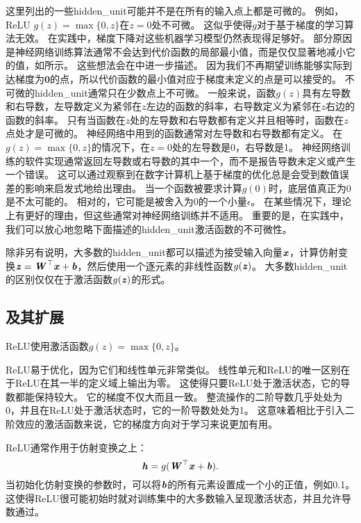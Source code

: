 这里列出的一些\gls{hidden_unit}可能并不是在所有的输入点上都是可微的。
例如，\gls{ReLU} $g(z)=\max\{0, z\}$在$z=0$处不可微。
这似乎使得$g$对于基于梯度的学习算法无效。
在实践中，梯度下降对这些机器学习模型仍然表现得足够好。
部分原因是神经网络训练算法通常不会达到代价函数的局部最小值，而是仅仅显著地减小它的值，如所示。
这些想法会在中进一步描述。
因为我们不再期望训练能够实际到达梯度为$\bm{0}$的点，所以代价函数的最小值对应于梯度未定义的点是可以接受的。
不可微的\gls{hidden_unit}通常只在少数点上不可微。
一般来说，函数$g(z)$具有左导数和右导数，左导数定义为紧邻在$z$左边的函数的斜率，右导数定义为紧邻在$z$右边的函数的斜率。
只有当函数在$z$处的左导数和右导数都有定义并且相等时，函数在$z$点处才是可微的。
神经网络中用到的函数通常对左导数和右导数都有定义。
在$g(z)=\max\{0,z\}$的情况下，在$z=0$处的左导数是0，右导数是1。
神经网络训练的软件实现通常返回左导数或右导数的其中一个，而不是报告导数未定义或产生一个错误。
这可以通过观察到在数字计算机上基于梯度的优化总是会受到数值误差的影响来启发式地给出理由。
当一个函数被要求计算$g(0)$时，底层值真正为0 是不太可能的。
相对的，它可能是被舍入为0的一个小量$\epsilon$。
在某些情况下，理论上有更好的理由，但这些通常对神经网络训练并不适用。
重要的是，在实践中，我们可以放心地忽略下面描述的\gls{hidden_unit}激活函数的不可微性。


除非另有说明，大多数的\gls{hidden_unit}都可以描述为接受输入向量$\boldsymbol{\mathit{x}}$，计算仿射变换$\boldsymbol{\mathit{z}}=\boldsymbol{\mathit{W}}^\top \boldsymbol{\mathit{x}}+\boldsymbol{\mathit{b}}$，然后使用一个逐元素的非线性函数$g(\boldsymbol{\mathit{z}})$。
大多数\gls{hidden_unit}的区别仅仅在于激活函数$g(\boldsymbol{\mathit{z}})$的形式。

\subsection{及其扩展}
\label{sec:rectified_linear_units_and_their_generalizations}

\gls{ReLU}使用激活函数$g(z)=\max\{0, z\}$。

\gls{ReLU}易于优化，因为它们和线性单元非常类似。
线性单元和\gls{ReLU}的唯一区别在于\gls{ReLU}在其一半的定义域上输出为零。
这使得只要\gls{ReLU}处于激活状态，它的导数都能保持较大。
它的梯度不仅大而且一致。
整流操作的二阶导数几乎处处为0，并且在\gls{ReLU}处于激活状态时，它的一阶导数处处为1。
这意味着相比于引入二阶效应的激活函数来说，它的梯度方向对于学习来说更加有用。

\gls{ReLU}通常作用于仿射变换之上：
\begin{equation}
\boldsymbol{\mathit{h}} = g(\boldsymbol{\mathit{W}}^\top \boldsymbol{\mathit{x}} + \boldsymbol{\mathit{b}}).
\end{equation}
当初始化仿射变换的参数时，可以将$\boldsymbol{\mathit{b}}$的所有元素设置成一个小的正值，例如0.1。
这使得\gls{ReLU}很可能初始时就对训练集中的大多数输入呈现激活状态，并且允许导数通过。

